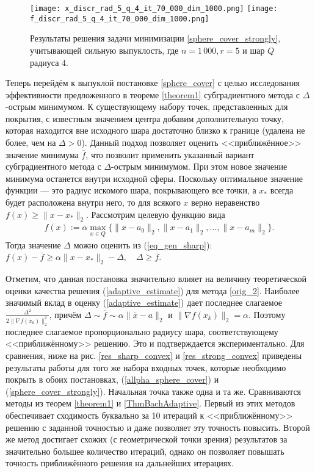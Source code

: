     \begin{figure}[h]
        \texttt{[image: x\_discr\_rad\_5\_q\_4\_it\_70\_000\_dim\_1000.png]}
        \endminipage\hfill
        \texttt{[image: f\_discr\_rad\_5\_q\_4\_it\_70\_000\_dim\_1000.png]}
        \endminipage\hfill
        \caption{Результаты решения задачи минимизации \eqref{sphere_cover_strongly}, учитывающей сильную выпуклость, где  $n= 1\,000, r = 5$ и  шар $Q$ радиуса 4.}
        \label{res_ex_strong_r5}
    \end{figure}

    Теперь перейдём к выпуклой постановке \eqref{sphere_cover} с целью исследования эффективности предложенного в теореме \ref{theorem1} субградиентного метода с $\Delta$-острым минимумом. К существующему набору точек, представленных для покрытия, с известным значением центра добавим дополнительную точку, которая находится вне исходного шара достаточно близко к границе (удалена не более, чем на $\Delta > 0$). Данный подход позволяет оценить <<приближённое>> значение минимума $\overline{f}$, что позволит применить указанный вариант субградиентного метода с $\Delta$-острым минимумом. При этом новое значение минимума останется внутри исходной сферы. Поскольку оптимальное значение функции --- это радиус искомого шара, покрывающего все точки, а $x_*$ всегда будет расположена внутри него, то для всякого $x$ верно неравенство $ f(x) \geq \| x - x_*\|_2$. Рассмотрим целевую функцию вида
    \begin{gather}\label{allpha_sphere_cover}
        f(x) := \alpha \max_{x\in Q}\{\|x - a_0\|_2, \|x - a_1\|_2, ..., \|x - a_m\|_2\}.
    \end{gather}
    Тогда значение $\Delta$ можно оценить  из (\ref{eq_gen_sharp}): 
        $f(x) - \overline{f} \geq \alpha\|x- x_*\|_2 - \Delta, \quad \Delta \geq \overline{f}$.

    Отметим, что данная постановка значительно влияет на величину теоретической оценки качества решения (\ref{adaptive_estimate}) для метода \eqref{orig_2}.
    Наиболее значимый вклад в оценку (\ref{adaptive_estimate}) дает последнее слагаемое $\frac{\Delta^2}{2\|\nabla f(x_k)\|^2_2}$, причём 
    $     \Delta \sim \overline{f} \sim \alpha \|\overline{x}-a\|_2 $ и 
    $     \|\nabla f(x_k)\|_2 = \alpha $. Поэтому последнее слагаемое пропорционально радиусу шара, соответствующему <<приближённому>> решению. Это и подтверждается экспериментально. Для сравнения, ниже на рис. \ref{res_sharp_convex} и \ref{res_strong_convex} приведены результаты работы для того же набора входных точек, которые необходимо покрыть в обоих постановках, (\ref{allpha_sphere_cover}) и (\ref{sphere_cover_strongly}). Начальная точка также одна и та же. Сравниваются методы из теорем \ref{theorem1} и \ref{ThmBachAdaptive}. Первый из этих методов обеспечивает сходимость буквально за 10 итераций к <<приближённому>> решению с заданной точностью и даже позволяет эту точность повысить. Второй же метод достигает схожих (с геометрической точки зрения) результатов за значительно большее количество итераций, однако он позволяет повышать точность приближённого решения на дальнейших итерациях.

